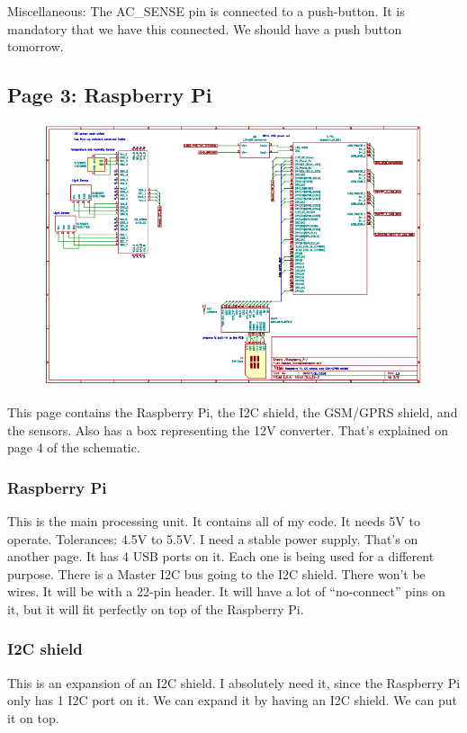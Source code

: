 Miscellaneous:
The AC\_SENSE pin is connected to a push-button. It is mandatory that we have this connected. We should have a push button tomorrow.

\subsection{Page 3: Raspberry Pi}
\begin{figure}
	\includegraphics{./graphics/schematic/sch_page_3.png}
\end{figure}
This page contains the Raspberry Pi, the I2C shield, the GSM/GPRS shield, and the sensors. Also has a box representing the 12V converter. That’s explained on page 4 of the schematic.

\subsubsection{Raspberry Pi}
This is the main processing unit. It contains all of my code. It needs 5V to operate. Tolerances: 4.5V to 5.5V. I need a stable power supply. That’s on another page. It has 4 USB ports on it. Each one is being used for a different purpose. There is a Master I2C bus going to the I2C shield. There won’t be wires. It will be with a 22-pin header. It will have a lot of “no-connect” pins on it, but it will fit perfectly on top of the Raspberry Pi.

\subsubsection{I2C shield}

This is an expansion of an I2C shield. I absolutely need it, since the Raspberry Pi only has 1 I2C port on it. We can expand it by having an I2C shield. We can put it on top.

